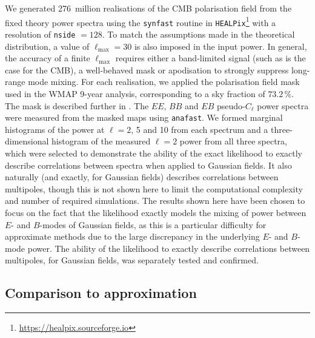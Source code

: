 We generated 276~million realisations of the CMB polarisation field from the fixed theory power spectra using the \texttt{synfast} routine in \texttt{HEALPix}\footnote{\url{https://healpix.sourceforge.io}} \citep{Gorski2005,Zonca2019} with a resolution of \texttt{nside} $= 128$. To match the assumptions made in the theoretical distribution, a value of $\ell_\text{max} = 30$ is also imposed in the input power. In general, the accuracy of a finite $\ell_\text{max}$ requires either a band-limited signal (such as is the case for the CMB), a well-behaved mask or apodisation to strongly suppress long-range mode mixing. For each realisation, we applied the polarisation field mask used in the WMAP 9-year analysis, corresponding to a sky fraction of $73.2\,\%$. The mask is described further in \citet{Bennett2013}. The $EE$, $BB$ and $EB$ pseudo-$C_\ell$ power spectra were measured from the masked maps using \texttt{anafast}.
We formed marginal histograms of the power at $\ell = 2$, 5 and 10 from each spectrum and a three-dimensional histogram of the measured $\ell = 2$ power from all three spectra, which were selected to demonstrate the ability of the exact likelihood to exactly describe correlations between spectra when applied to Gaussian fields. It also naturally (and exactly, for Gaussian fields) describes correlations between multipoles, though this is not shown here to limit the computational complexity and number of required simulations.
The results shown here have been chosen to focus on the fact that the likelihood exactly models the mixing of power between $E$- and $B$-modes of Gaussian fields, as this is a particular difficulty for approximate methods due to the large discrepancy in the underlying $E$- and $B$-mode power.
The ability of the likelihood to exactly describe correlations between multipoles, for Gaussian fields, was separately tested and confirmed.

\subsection{Comparison to approximation}
\label{el_Eqn:sec_approx}

